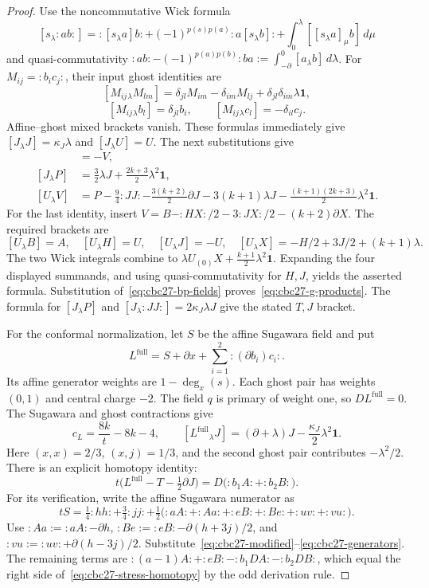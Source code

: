 \begin{proof}
Use the noncommutative Wick formula
\[
 [s_\lambda:ab:]=:[s_\lambda a]b:
 +(-1)^{p(s)p(a)}:a[s_\lambda b]:
 +\int_0^\lambda[[s_\lambda a]_\mu b]\,d\mu
\]
and quasi-commutativity $:ab:-(-1)^{p(a)p(b)}:ba:=\int_{-\partial}^0[a_\lambda b]\,d\lambda$.
For $M_{ij}=:b_ic_j:$, their input ghost identities are
\[
 [M_{ij}{}_{\lambda}M_{lm}]
 =\delta_{jl}M_{im}-\delta_{im}M_{lj}
   +\delta_{jl}\delta_{im}\lambda\mathbf1,
\]
\[
 [M_{ij}{}_{\lambda}b_l]=\delta_{jl}b_i,
 \qquad [M_{ij}{}_{\lambda}c_l]=-\delta_{il}c_j.
\]
Affine--ghost mixed brackets vanish.
These formulas immediately give $[J_\lambda J]=\kappa_J\lambda$ and $[J_\lambda U]=U$.
The next substitutions give
\begin{align*}
 [J_\lambda V]&=-V,\\
 [J_\lambda P]&=\tfrac32\lambda J+\tfrac{2k+3}{2}\lambda^2\mathbf1,\\
 [U_\lambda V]&=P-\tfrac94:JJ:-\tfrac{3(k+2)}2\partial J
 -3(k+1)\lambda J-\tfrac{(k+1)(2k+3)}2\lambda^2\mathbf1.
\end{align*}
For the last identity, insert $V=B-:HX:/2-3:JX:/2-(k+2)\partial X$.
The required brackets are
\[
 [U_\lambda B]=A,\quad [U_\lambda H]=U,\quad
 [U_\lambda J]=-U,\quad
 [U_\lambda X]=-H/2+3J/2+(k+1)\lambda.
\]
The two Wick integrals combine to
$\lambda U_{(0)}X+\frac{k+1}{2}\lambda^2\mathbf1$.
Expanding the four displayed summands, and using quasi-commutativity for $H,J$, yields the asserted formula.
Substitution of~\eqref{eq:cbc27-bp-fields} proves~\eqref{eq:cbc27-g-products}.
The formula for $[J_\lambda P]$ and $[J_\lambda:JJ:]=2\kappa_J\lambda J$ give the stated $T,J$ bracket.

For the conformal normalization, let $S$ be the affine Sugawara field and put
\[
 L^{\mathrm{full}}=S+\partial x+\sum_{i=1}^2:(\partial b_i)c_i:.
\]
Its affine generator weights are $1-\deg_x(s)$.
Each ghost pair has weights $(0,1)$ and central charge $-2$.
The field $q$ is primary of weight one, so $DL^{\mathrm{full}}=0$.
The Sugawara and ghost contractions give
\[
 c_L=\frac{8k}{t}-8k-4,
 \qquad [L^{\mathrm{full}}{}_{\lambda}J]
 = (\partial+\lambda)J-\frac{\kappa_J}{2}\lambda^2\mathbf1.
\]
Here $(x,x)=2/3$, $(x,j)=1/3$, and the second ghost pair contributes $-\lambda^2/2$.
There is an explicit homotopy identity:
\begin{equation}\label{eq:cbc27-stress-homotopy}
 t\bigl(L^{\mathrm{full}}-T-\tfrac12\partial J\bigr)
 =D\bigl(:b_1A:+:b_2B:\bigr).
\end{equation}
For its verification, write the affine Sugawara numerator as
\[
 tS=\tfrac14:hh:+\tfrac34:jj:
 +\tfrac12\bigl(:aA:+:Aa:+:eB:+:Be:+:uv:+:vu:\bigr).
\]
Use
$:Aa:=:aA:-\partial h$,
$:Be:=:eB:-\partial(h+3j)/2$, and
$:vu:=:uv:+\partial(h-3j)/2$.
Substitute~\eqref{eq:cbc27-modified}--\eqref{eq:cbc27-generators}.
The remaining terms are
$:(a-1)A:+:eB:-:b_1DA:-:b_2DB:$,
which equal the right side of~\eqref{eq:cbc27-stress-homotopy} by the odd derivation rule.


\end{proof}

